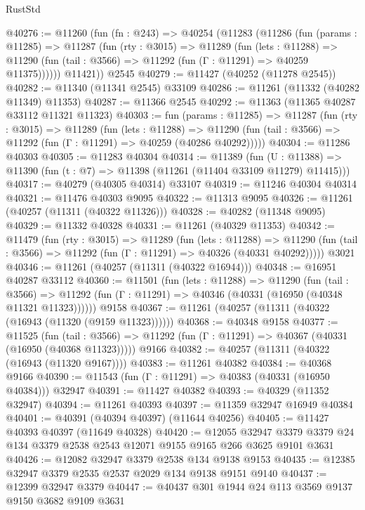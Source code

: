 \begin{lexlean}{RustStd}
\begin{coremodule}
@40276 := @11260
    (fun (fn : @243) =>
    @40254
      (@11283
        (@11286
          (fun (params : @11285) =>
          @11287
            (fun (rty : @3015) =>
            @11289
              (fun (lets : @11288) =>
              @11290 (fun (tail : @3566) => @11292 (fun (Γ : @11291) => @40259 @11375))))))
        @11421))
    @2545
@40279 := @11427 (@40252 (@11278 @2545))
@40282 := @11340 (@11341 @2545) @33109
@40286 := @11261 (@11332 (@40282 @11349) @11353)
@40287 := @11366 @2545
@40292 := @11363 (@11365 @40287 @33112 @11321 @11323)
@40303 := fun (params : @11285) =>
  @11287
    (fun (rty : @3015) =>
    @11289
      (fun (lets : @11288) =>
      @11290 (fun (tail : @3566) => @11292 (fun (Γ : @11291) => @40259 (@40286 @40292)))))
@40304 := @11286 @40303
@40305 := @11283 @40304
@40314 := @11389
    (fun (U : @11388) => @11390 (fun (t : @7) => @11398 (@11261 (@11404 @33109 @11279) @11415)))
@40317 := @40279 (@40305 @40314) @33107
@40319 := @11246 @40304 @40314
@40321 := @11476 @40303 @9095
@40322 := @11313 @9095
@40326 := @11261 (@40257 (@11311 (@40322 @11326)))
@40328 := @40282 (@11348 @9095)
@40329 := @11332 @40328
@40331 := @11261 (@40329 @11353)
@40342 := @11479
    (fun (rty : @3015) =>
    @11289
      (fun (lets : @11288) =>
      @11290 (fun (tail : @3566) => @11292 (fun (Γ : @11291) => @40326 (@40331 @40292)))))
    @3021
@40346 := @11261 (@40257 (@11311 (@40322 @16944)))
@40348 := @16951 @40287 @33112
@40360 := @11501
    (fun (lets : @11288) =>
    @11290
      (fun (tail : @3566) =>
      @11292 (fun (Γ : @11291) => @40346 (@40331 (@16950 (@40348 @11321 @11323))))))
    @9158
@40367 := @11261 (@40257 (@11311 (@40322 (@16943 (@11320 (@9159 @11323))))))
@40368 := @40348 @9158
@40377 := @11525
    (fun (tail : @3566) => @11292 (fun (Γ : @11291) => @40367 (@40331 (@16950 (@40368 @11323)))))
    @9166
@40382 := @40257 (@11311 (@40322 (@16943 (@11320 @9167))))
@40383 := @11261 @40382
@40384 := @40368 @9166
@40390 := @11543 (fun (Γ : @11291) => @40383 (@40331 (@16950 @40384))) @32947
@40391 := @11427 @40382
@40393 := @40329 (@11352 @32947)
@40394 := @11261 @40393
@40397 := @11359 @32947 @16949 @40384
@40401 := @40391 (@40394 @40397) (@11644 @40256)
@40405 := @11427 @40393 @40397 (@11649 @40328)
@40420 := @12055
    @32947
    @3379
    @3379
    @24
    @134
    @3379
    @2538
    @2543
    @12071
    @9155
    @9165
    @266
    @3625
    @9101
    @3631
@40426 := @12082 @32947 @3379 @2538 @134 @9138 @9153
@40435 := @12385 @32947 @3379 @2535 @2537 @2029 @134 @9138 @9151 @9140
@40437 := @12399 @32947 @3379
@40447 := @40437 @301 @1944 @24 @113 @3569 @9137 @9150 @3682 @9109 @3631

\end{coremodule}
\end{lexlean}
